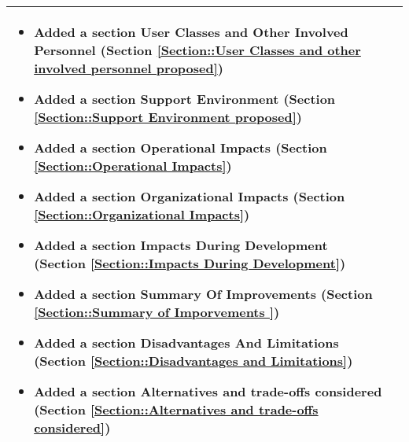\begin{longtable}{|l||p{13.5cm}|}
\begin{itemize}[topsep=0pt,itemsep=0pt,parsep=0pt,partopsep=0pt,leftmargin=12pt]
\item Added a section User Classes and Other Involved Personnel (Section \ref{Section::User Classes and other involved personnel proposed})
\item Added a section Support Environment (Section \ref{Section::Support Environment proposed})
\item Added a section Operational Impacts (Section \ref{Section::Operational Impacts})
\item Added a section Organizational Impacts (Section \ref{Section::Organizational Impacts})
\item Added a section Impacts During Development (Section \ref{Section::Impacts During Development})
\item Added a section Summary Of Improvements (Section \ref{Section::Summary of Imporvements })
\item Added a section Disadvantages And Limitations (Section \ref{Section::Disadvantages and Limitations})
\item Added a section Alternatives and trade-offs considered (Section \ref{Section::Alternatives and trade-offs considered})
\end{itemize} 
\\ \hline


\end{longtable}


